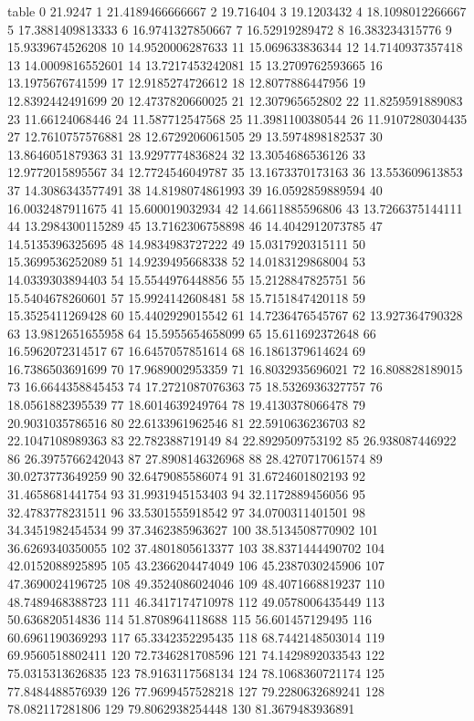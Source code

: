 table {%
0 21.9247
1 21.4189466666667
2 19.716404
3 19.1203432
4 18.1098012266667
5 17.3881409813333
6 16.9741327850667
7 16.52919289472
8 16.383234315776
9 15.9339674526208
10 14.9520006287633
11 15.069633836344
12 14.7140937357418
13 14.0009816552601
14 13.7217453242081
15 13.2709762593665
16 13.1975676741599
17 12.9185274726612
18 12.8077886447956
19 12.8392442491699
20 12.4737820660025
21 12.307965652802
22 11.8259591889083
23 11.66124068446
24 11.587712547568
25 11.3981100380544
26 11.9107280304435
27 12.7610757576881
28 12.6729206061505
29 13.5974898182537
30 13.8646051879363
31 13.9297774836824
32 13.3054686536126
33 12.9772015895567
34 12.7724546049787
35 13.1673370173163
36 13.553609613853
37 14.3086343577491
38 14.8198074861993
39 16.0592859889594
40 16.0032487911675
41 15.600019032934
42 14.6611885596806
43 13.7266375144111
44 13.2984300115289
45 13.7162306758898
46 14.4042912073785
47 14.5135396325695
48 14.9834983727222
49 15.0317920315111
50 15.3699536252089
51 14.9239495668338
52 14.0183129868004
53 14.0339303894403
54 15.5544976448856
55 15.2128847825751
56 15.5404678260601
57 15.9924142608481
58 15.7151847420118
59 15.3525411269428
60 15.4402929015542
61 14.7236476545767
62 13.927364790328
63 13.9812651655958
64 15.5955654658099
65 15.611692372648
66 16.5962072314517
67 16.6457057851614
68 16.1861379614624
69 16.7386503691699
70 17.9689002953359
71 16.8032935696021
72 16.808828189015
73 16.6644358845453
74 17.2721087076363
75 18.5326936327757
76 18.0561882395539
77 18.6014639249764
78 19.4130378066478
79 20.9031035786516
80 22.6133961962546
81 22.5910636236703
82 22.1047108989363
83 22.782388719149
84 22.8929509753192
85 26.938087446922
86 26.3975766242043
87 27.8908146326968
88 28.4270717061574
89 30.0273773649259
90 32.6479085586074
91 31.6724601802193
92 31.4658681441754
93 31.9931945153403
94 32.1172889456056
95 32.4783778231511
96 33.5301555918542
97 34.0700311401501
98 34.3451982454534
99 37.3462385963627
100 38.5134508770902
101 36.6269340350055
102 37.4801805613377
103 38.8371444490702
104 42.0152088925895
105 43.2366204474049
106 45.2387030245906
107 47.3690024196725
108 49.3524086024046
109 48.4071668819237
110 48.7489468388723
111 46.3417174710978
112 49.0578006435449
113 50.636820514836
114 51.8708964118688
115 56.601457129495
116 60.6961190369293
117 65.3342352295435
118 68.7442148503014
119 69.9560518802411
120 72.7346281708596
121 74.1429892033543
122 75.0315313626835
123 78.9163117568134
124 78.1068360721174
125 77.8484488576939
126 77.9699457528218
127 79.2280632689241
128 78.082117281806
129 79.8062938254448
130 81.3679483936891
}
